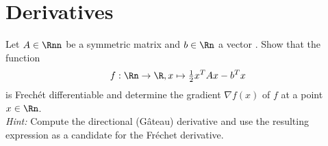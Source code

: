 \section{Derivatives}
Let $A \in \Rnn$ be a symmetric matrix  and $b \in\Rn$ a vector . Show that the function
$$f : \Rn \to \R, x \mapsto
\tfrac{1}{2} x^T Ax - b^T x$$
is Frechét differentiable and determine the gradient $\nabla f(x)$ of $f$ at a point $x \in\Rn$.\\[0.3cm]
\textit{Hint:} Compute the directional (Gâteau) derivative and use the resulting expression as a candidate for the
Fréchet derivative. 
